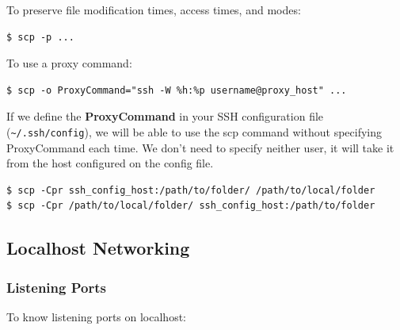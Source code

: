 \documentclass{article}
\newenvironment{blocktemplate}[1]{%
    \tcolorbox[beamer,%
    noparskip,breakable,
    colframe=Blue,%
    colbacklower=LimeGreen!75!LightGreen,%
    title=#1]}%
    {\endtcolorbox}
\newenvironment{codetemplate}[1][]{%
  \mybasecolorbox[#1]
  \itshape
}{%
  \endmybasecolorbox
}
\begin{document}
To preserve file modification times, access times, and modes:
\begin{codetemplate}{}
\begin{verbatim}
$ scp -p ...
\end{verbatim}
\end{codetemplate}

To use a proxy command:
\begin{codetemplate}{}
\begin{verbatim}
$ scp -o ProxyCommand="ssh -W %h:%p username@proxy_host" ...
\end{verbatim}
\end{codetemplate}

\begin{blocktemplate}{NOTE}
If we define the \textbf{ProxyCommand} in your SSH configuration file (\verb|~/.ssh/config|),
we will be able to use the scp command without specifying ProxyCommand each time. We don't need to specify neither user,
it will take it from the host configured on the config file.
\begin{codetemplate}{}
\begin{verbatim}
$ scp -Cpr ssh_config_host:/path/to/folder/ /path/to/local/folder
$ scp -Cpr /path/to/local/folder/ ssh_config_host:/path/to/folder
\end{verbatim}
\end{codetemplate}
\end{blocktemplate}

\subsection{Localhost Networking}
\subsubsection{Listening Ports}
To know listening ports on localhost:
\end{document}
